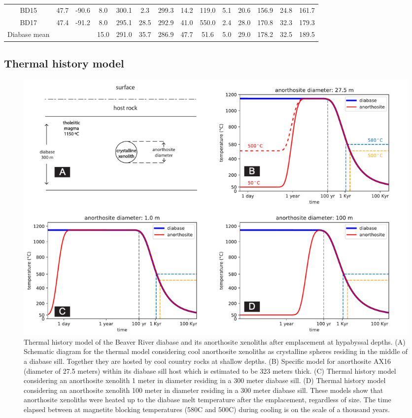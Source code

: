 \begin{table}
\begin{tabular}{cccccccccccccc}
BD15             & 47.7 & -90.6 & 8.0  & 300.1   & 2.3          & 299.3   & 14.2    & 119.0 & 5.1                     & 20.6        & 156.9       & 24.8         & 161.7        \\
BD17             & 47.4 & -91.2 & 8.0  & 295.1   & 28.5         & 292.9   & 41.0    & 550.0 & 2.4                     & 28.0        & 170.8       & 32.3         & 179.3        \\
\hline
Diabase mean     &      &       & 15.0 & 291.0   & 35.7         & 286.9   & 47.7    & 51.6  & 5.0                     & 29.0        & 178.2       & 32.5         & 189.5       \\
\hline
\end{tabular}
\label{tab:Pmag_site_data}
\end{table}


\subsection{Thermal history model}

\begin{figure}
\noindent\includegraphics[width=\textwidth]{figure/Zhang2021/thermal_history_model.pdf}
\caption{\footnotesize{Thermal history model of the Beaver River diabase and its anorthosite xenoliths after emplacement at hypabyssal depths. (A) Schematic diagram for the thermal model considering cool anorthosite xenoliths as crystalline spheres residing in the middle of a diabase sill. Together they are hosted by cool country rocks at shallow depths. (B) Specific model for anorthosite AX16 (diameter of 27.5 meters) within its diabase sill host which is estimated to be 323 meters thick. (C) Thermal history model considering an anorthosite xenolith 1 meter in diameter residing in a 300 meter diabase sill. (D) Thermal history model considering an anorthosite xenolith 100 meter in diameter residing in a 300 meter diabase sill. These models show that anorthosite xenoliths were heated up to the diabase melt temperature after the emplacement, regardless of size. The time elapsed between at magnetite blocking temperatures (580\textdegree C and 500\textdegree C) during cooling is on the scale of a thousand years.}}
\label{fig:thermal_history_model}
\end{figure}

